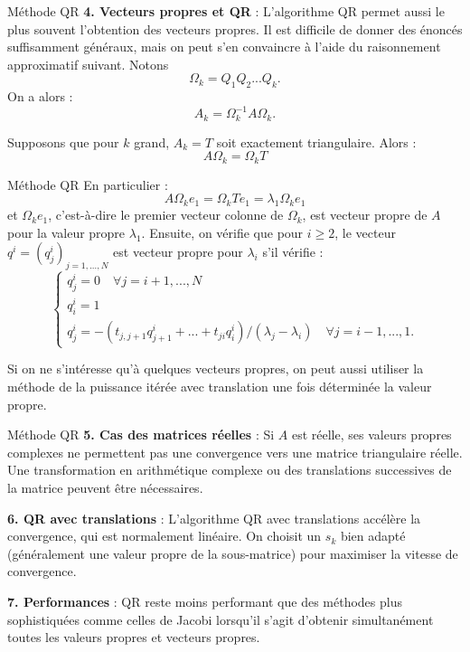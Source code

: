 \documentclass[french, 10pt]{beamer}
\theoremstyle{definition}
\begin{document}
\begin{frame}{Méthode QR}
	\textbf{4. Vecteurs propres et QR} : L’algorithme QR permet aussi le plus souvent l’obtention des vecteurs propres. Il est difficile de donner des énoncés suffisamment généraux, mais on peut s’en convaincre à l’aide du raisonnement approximatif suivant. Notons 
	\[
	\Omega_k = Q_1Q_2...Q_k.
	\]
	On a alors :
	\[
	A_k = \Omega_k^{-1} A \Omega_k.
	\]
	
	Supposons que pour \( k \) grand, \( A_k = T \) soit exactement triangulaire. Alors :
	\[
	A\Omega_k = \Omega_k T
	\]
	
	
	
\end{frame}


\begin{frame}{Méthode QR}
	En particulier :
	\[
	A\Omega_k e_1 = \Omega_k T e_1 = \lambda_1 \Omega_k e_1
	\]
	et \( \Omega_k e_1 \), c’est-à-dire le premier vecteur colonne de \( \Omega_k \), est vecteur propre de \( A \) pour la valeur propre \( \lambda_1 \). Ensuite, on vérifie que pour \( i \geq 2 \), le vecteur \( q^i = (q^i_j)_{j=1, ..., N} \) est vecteur propre pour \( \lambda_i \) s’il vérifie :
	\[
	\begin{cases}
		q^i_j = 0 \quad \forall j = i + 1, ..., N \\
		q^i_i = 1 \\
		q^i_j = - (t_{j,j+1} q^i_{j+1} + ... + t_{ji} q^i_i) / (\lambda_j - \lambda_i) \quad \forall j = i - 1, ..., 1.
	\end{cases}
	\]
	
	Si on ne s’intéresse qu’à quelques vecteurs propres, on peut aussi utiliser la méthode de la puissance itérée avec translation une fois déterminée la valeur propre.
	
\end{frame}



\begin{frame}{Méthode QR}
	\textbf{5. Cas des matrices réelles} : Si \( A \) est réelle, ses valeurs propres complexes ne permettent pas une convergence vers une matrice triangulaire réelle. Une transformation en arithmétique complexe ou des translations successives de la matrice peuvent être nécessaires.
	
	\textbf{6. QR avec translations} : L'algorithme QR avec translations accélère la convergence, qui est normalement linéaire. On choisit un \( s_k \) bien adapté (généralement une valeur propre de la sous-matrice) pour maximiser la vitesse de convergence.
	
	\textbf{7. Performances} : QR reste moins performant que des méthodes plus sophistiquées comme celles de Jacobi lorsqu'il s'agit d'obtenir simultanément toutes les valeurs propres et vecteurs propres.
	
\end{frame}
\end{document}
